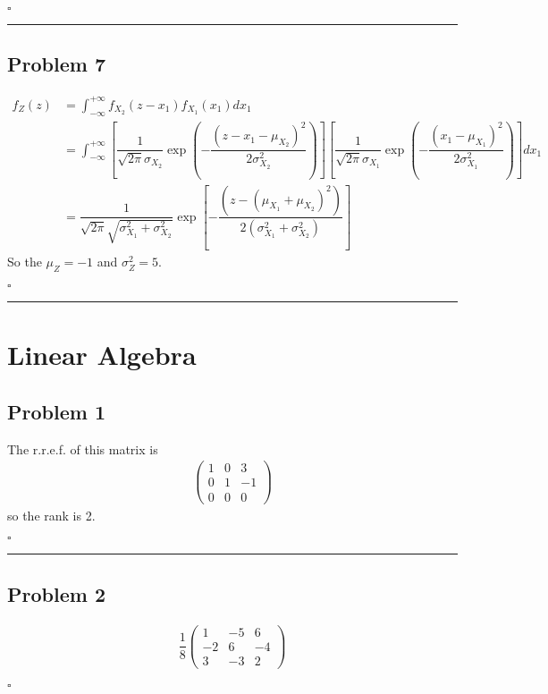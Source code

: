\documentclass[12pt]{article}
\newcommand*{\QEDB}{\hfill\ensuremath{\square}}
\newcommand{\SBrackets}[1]{\left[#1\right]}
\newcommand{\ParTh}[1]{\left(#1\right)}
\newcommand{\Matrix}[2]{\ParTh{\begin{array}{#1}#2\end{array}}}
\newcommand{\horrule}[1]{\rule{\linewidth}{#1}}
\begin{document}
\QEDB

\horrule{0.5pt}

\subsection*{Problem 7}

\begin{align}
f_Z\ParTh{z}&=\int_{-\infty}^{+\infty}f_{X_2}\ParTh{z-x_1}f_{X_1}\ParTh{x_1}dx_1\\
&=\int_{-\infty}^{+\infty}\SBrackets{\dfrac{1}{\sqrt{2\pi}\sigma_{X_2}}\exp\ParTh{-\dfrac{\ParTh{z-x_1-\mu_{X_2}}^2}{2\sigma^2_{X_2}}}}\SBrackets{\dfrac{1}{\sqrt{2\pi}\sigma_{X_1}}\exp\ParTh{-\dfrac{\ParTh{x_1-\mu_{X_1}}^2}{2\sigma^2_{X_1}}}}dx_1\\
&=\dfrac{1}{\sqrt{2\pi}\sqrt{\sigma^2_{X_1}+\sigma^2_{X_2}}}\exp\SBrackets{-\dfrac{\ParTh{z-\ParTh{\mu_{X_1}+\mu_{X_2}}^2}}{2\ParTh{\sigma^2_{X_1}+\sigma^2_{X_2}}}}
\end{align}
So the $\mu_Z=-1$ and $\sigma^2_Z=5$.

\QEDB

\horrule{0.5pt}

\section{Linear Algebra}

\subsection*{Problem 1}

The r.r.e.f. of this matrix is
\begin{align}
\Matrix{ccc}{1&0&3\\0&1&-1\\0&0&0}
\end{align}
so the rank is 2.

\QEDB

\horrule{0.5pt}

\subsection*{Problem 2}

\begin{align}
\dfrac{1}{8}\Matrix{ccc}{1&-5&6\\-2&6&-4\\3&-3&2}
\end{align}

\QEDB
\end{document}
